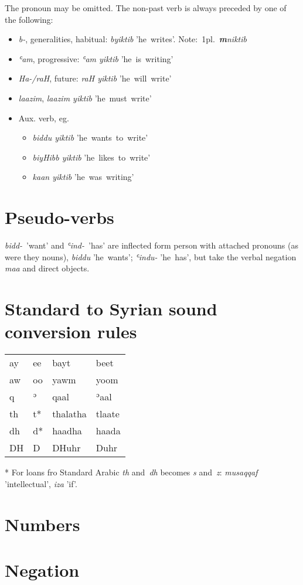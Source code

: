 \documentclass{article}
\begin{document}
The pronoun may be omitted. The non-past verb is always preceded by one of the following:

\begin{itemize}
\item\textit{b-}, generalities, habitual: \textit{byiktib} 'he~writes'. Note:~1pl.~\textit{\textbf{m}niktib}
\item\textit{ʿam}, progressive: \textit{ʿam yiktib} 'he~is~writing'
\item\textit{Ha-/raH}, future: \textit{raH yiktib} 'he~will~write'
\item\textit{laazim}, \textit{laazim yiktib} 'he~must~write'
\item Aux. verb, eg.
  \begin{itemize}
    \item[] \textit{biddu yiktib} 'he~wants~to~write'
    \item[] \textit{biyHibb yiktib} 'he~likes~to~write'
    \item[] \textit{kaan yiktib} 'he~was~writing'
  \end{itemize}
\end{itemize}

\section{Pseudo-verbs}

\textit{bidd-}~'want' and \textit{ʿind-}~'has' are inflected form person with attached pronouns (as were they nouns), \textit{biddu} 'he~wants'; \textit{ʿindu-} 'he~has', but take the verbal negation \textit{maa} and direct objects.


\section{Standard to Syrian sound conversion rules}


{\itshape
\begin{tabular}{l@{~→~}ll@{~→~}l}

  ay & ee & bayt & beet \\
  aw & oo & yawm & yoom \\
  q  & ʾ  & qaal & ʾaal \\
  th & t*  & thalatha & tlaate \\
  dh & d*  & haadha & haada \\
  DH & D  & DHuhr & Duhr \\

\end{tabular}
}

* For loans fro Standard Arabic \textit{th} and~\textit{dh} becomes \textit{s} and~\textit{z}: \textit{musaqqaf} 'intellectual', \textit{iza} 'if'.

\section{Numbers}

\section{Negation}
\end{document}
